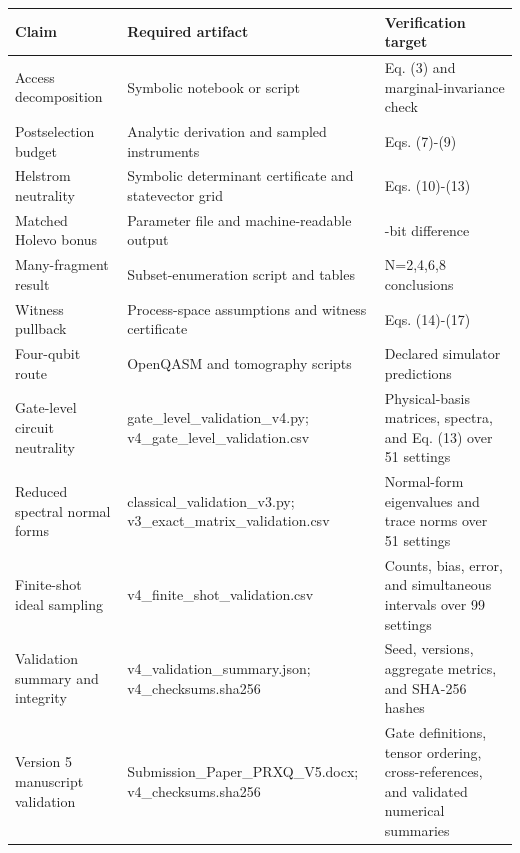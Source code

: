 \documentclass[
]{article}
\begin{document}
\begin{longtable}[]{@{}
  >{\raggedright\arraybackslash}p{}
  >{\raggedright\arraybackslash}p{}
  >{\raggedright\arraybackslash}p{}@{}}
\toprule\noalign{}
\begin{minipage}[b]{\linewidth}\raggedright
\textbf{Claim}
\end{minipage} & \begin{minipage}[b]{\linewidth}\raggedright
\textbf{Required artifact}
\end{minipage} & \begin{minipage}[b]{\linewidth}\raggedright
\textbf{Verification target}
\end{minipage} \\
\midrule\noalign{}
\endhead
\bottomrule\noalign{}
\endlastfoot
Access decomposition & Symbolic notebook or script & Eq. (3) and
marginal-invariance check \\
Postselection budget & Analytic derivation and sampled instruments &
Eqs. (7)-(9) \\
Helstrom neutrality & Symbolic determinant certificate and statevector
grid & Eqs. (10)-(13) \\
Matched Holevo bonus & Parameter file and machine-readable output &
0.0839771759-bit difference \\
Many-fragment result & Subset-enumeration script and tables & N=2,4,6,8
conclusions \\
Witness pullback & Process-space assumptions and witness certificate &
Eqs. (14)-(17) \\
Four-qubit route & OpenQASM and tomography scripts & Declared simulator
predictions \\
Gate-level circuit neutrality & gate\_level\_validation\_v4.py;
v4\_gate\_level\_validation.csv & Physical-basis matrices, spectra, and
Eq. (13) over 51 settings \\
Reduced spectral normal forms & classical\_validation\_v3.py;
v3\_exact\_matrix\_validation.csv & Normal-form eigenvalues and trace
norms over 51 settings \\
Finite-shot ideal sampling & v4\_finite\_shot\_validation.csv & Counts,
bias, error, and simultaneous intervals over 99 settings \\
Validation summary and integrity & v4\_validation\_summary.json;
v4\_checksums.sha256 & Seed, versions, aggregate metrics, and SHA-256
hashes \\
Version 5 manuscript validation & Submission\_Paper\_PRXQ\_V5.docx;
v4\_checksums.sha256 & Gate definitions, tensor ordering,
cross-references, and validated numerical summaries \\
\end{longtable}
\end{document}
